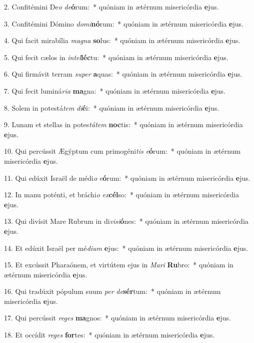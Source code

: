 2. Confitémini De\textit{o} \textit{de}\textbf{ó}rum:~*  quóniam in ætérnum misericórdia \textbf{e}jus.\

3. Confitémini Dómino \textit{do}\textit{mi}\textbf{nó}rum:~*  quóniam in ætérnum misericórdia \textbf{e}jus.\

4. Qui facit mirabília \textit{ma}\textit{gna} \textbf{so}lus:~*  quóniam in ætérnum misericórdia \textbf{e}jus.\

5. Qui fecit cælos in \textit{in}\textit{tel}\textbf{léc}tu:~*  quóniam in ætérnum misericórdia \textbf{e}jus.\

6. Qui firmávit terram \textit{su}\textit{per} \textbf{a}quas:~*  quóniam in ætérnum misericórdia \textbf{e}jus.\

7. Qui fecit luminá\textit{ri}\textit{a} \textbf{ma}gna:~*  quóniam in ætérnum misericórdia \textbf{e}jus.\

8. Solem in potestá\textit{tem} \textit{di}\textbf{é}i:~*  quóniam in ætérnum misericórdia \textbf{e}jus.\

9. Lunam et stellas in potes\textit{tá}\textit{tem} \textbf{noc}tis:~*  quóniam in ætérnum misericórdia \textbf{e}jus.\

10. Qui percússit Ægýptum cum primogéni\textit{tis} \textit{e}\textbf{ó}rum:~*  quóniam in ætérnum misericórdia \textbf{e}jus.\

11. Qui edúxit Israël de médi\textit{o} \textit{e}\textbf{ó}rum:~*  quóniam in ætérnum misericórdia \textbf{e}jus.\

12. In manu poténti, et bráchi\textit{o} \textit{ex}\textbf{cél}so:~*  quóniam in ætérnum misericórdia \textbf{e}jus.\

13. Qui divísit Mare Rubrum in di\textit{vi}\textit{si}\textbf{ó}nes:~*  quóniam in ætérnum misericórdia \textbf{e}jus.\

14. Et edúxit Israël per mé\textit{di}\textit{um} \textbf{e}jus:~*  quóniam in ætérnum misericórdia \textbf{e}jus.\

15. Et excússit Pharaónem, et virtútem ejus in \textit{Ma}\textit{ri} \textbf{Ru}bro:~*  quóniam in ætérnum misericórdia \textbf{e}jus.\

16. Qui tradúxit pópulum suum \textit{per} \textit{de}\textbf{sér}tum:~*  quóniam in ætérnum misericórdia \textbf{e}jus.\

17. Qui percússit \textit{re}\textit{ges} \textbf{ma}gnos:~*  quóniam in ætérnum misericórdia \textbf{e}jus.\

18. Et occídit \textit{re}\textit{ges} \textbf{for}tes:~*  quóniam in ætérnum misericórdia \textbf{e}jus.\

